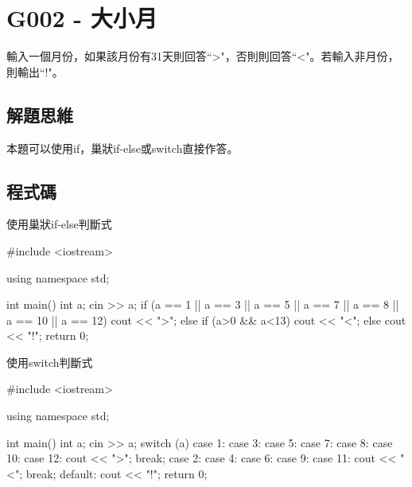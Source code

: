 \section{G002 - 大小月}
輸入一個月份，如果該月份有31天則回答``>"，否則則回答``<"。若輸入非月份，則輸出``!"。

\subsection{解題思維}
本題可以使用if，巢狀if-else或switch直接作答。

\subsection{程式碼}
使用巢狀if-else判斷式
\begin{cppcode}
	#include <iostream>
	
	using namespace std;
	
	int main()
	{
		int a;
		cin >> a;
		if (a == 1 || a == 3 || a == 5 || a == 7 || 
		    a == 8 || a == 10 || a == 12) cout << ">";
		else if (a>0 && a<13) cout << "<";
		else cout << "!";
		return 0;
	}
\end{cppcode}

\noindent 使用switch判斷式
\begin{cppcode}
	#include <iostream>
	
	using namespace std;
	
	int main()
	{
		int a;
		cin >> a;
		switch (a) {
		case 1: case 3: case 5: case 7:
		case 8: case 10: case 12:
			cout << ">"; break;
		case 2: case 4: case 6: case 9: case 11:
			cout << "<"; break;
		default:
			cout << "!";
		}
		return 0;
	}
\end{cppcode}
